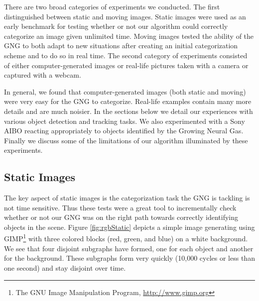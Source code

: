 \documentclass{article}
\renewcommand{\|}{\origbar} %
\begin{document}

There are two broad categories of experiments we conducted. The first distinguished between static and moving images. Static images were used as an early benchmark for testing whether or not our algorithm could correctly categorize an image given unlimited time. Moving images tested the ability of the GNG to both adapt to new situations after creating an initial categorization scheme and to do so in real time. The second category of experiments consisted of either computer-generated images or real-life pictures taken with a camera or captured with a webcam. 

In general, we found that computer-generated images (both static and moving) were very easy for the GNG to categorize. Real-life examples contain many more details and are much noisier. In the sections below we detail our experiences with various object detection and tracking tasks. We also experimented with a Sony AIBO reacting appropriately to objects identified by the Growing Neural Gas. Finally we discuss some of the limitations of our algorithm illuminated by these experiments.

\subsection{Static Images}


The key aspect of static images is the categorization task the GNG is tackling is not time sensitive. Thus these tests were a great tool to incrementally check whether or not our GNG was on the right path towards correctly identifying objects in the scene. Figure \ref{fig:rgbStatic} depicts a simple image generating using GIMP\footnote{The GNU Image Manipulation Program, \url{http://www.gimp.org}} with three colored blocks (red, green, and blue) on a white background. We see that four disjoint subgraphs have formed, one for each object and another for the background. These subgraphs form very quickly (10,000 cycles or less than one second) and stay disjoint over time. 
\end{document}
